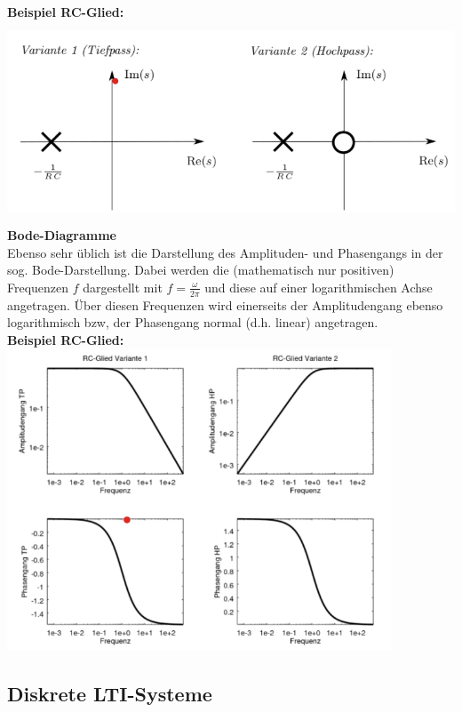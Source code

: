 \documentclass[12pt,a4paper]{scrartcl}
\begin{document}
  \noindent \textbf{Beispiel RC-Glied:}\\
  \includegraphics[height=6cm]{Pictures/PN.png} \\

  \noindent \textbf{Bode-Diagramme}\\
 \noindent  Ebenso sehr üblich ist die Darstellung des Amplituden- und Phasengangs in der sog. Bode-Darstellung. Dabei werden die (mathematisch nur positiven) Frequenzen $f$ dargestellt mit $f = \frac{\omega}{2\pi}$ und diese auf einer logarithmischen Achse angetragen. Über diesen Frequenzen wird einerseits der Amplitudengang ebenso logarithmisch bzw, der Phasengang normal (d.h. linear) angetragen. \\

  \noindent \textbf{Beispiel RC-Glied:}\\
  \includegraphics[height=9cm]{Pictures/Bode.png} \\

  \subsection{Diskrete LTI-Systeme}
  \label{sec:sub:diskrete-lti-systeme}
\end{document}
